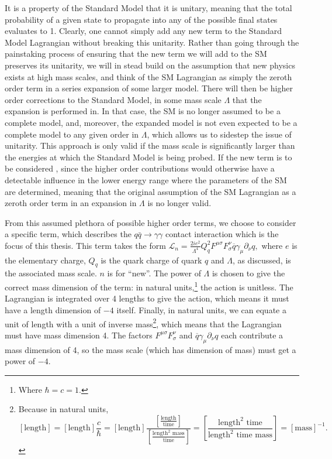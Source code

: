 It is a property of the Standard Model
that it is unitary, meaning that the total probability of a given state to propagate into any of the possible final states evaluates to 1. Clearly, one cannot simply add any new term to the Standard Model Lagrangian without breaking this unitarity. Rather than going through the painstaking process of ensuring that the new term we will add to the SM preserves its unitarity, we will in stead build on the assumption that new physics exists at high mass scales, and think of the SM Lagrangian as simply the zeroth order term in a series expansion of some larger model. There will then be higher order corrections to the Standard Model, in some mass scale $\Lambda$ that the expansion is performed in. 
In that case, the SM is no longer assumed to be a complete model, and, moreover, the expanded model is not even expected to be a complete model to any given order in $\Lambda$, which allows us to sidestep the issue of unitarity.
This approach is only valid if the mass scale is significantly larger than the energies at which the Standard Model is being probed. If the new term is to be considered , since the higher order contributions would otherwise have a detectable influence in the lower energy range where the parameters of the SM are determined, meaning that the original assumption of the SM Lagrangian as a zeroth order term in an expansion in $\Lambda$ is no longer valid.

From this assumed plethora of possible higher order terms, we choose to consider a specific term, which describes the $q\bar q\rightarrow\gamma\gamma$ contact interaction which is the focus of this thesis. This term takes the form \cite{rizzo}
\(\mathcal L_n = \frac{2ie^2}{\Lambda^4}Q_q^2F^{\mu\sigma}F^\nu_\sigma\overline{q}\gamma_\mu\partial_\nu q,\label{rizzo}\)
where $e$ is the elementary charge, $Q_q$ is the quark charge of quark $q$ and $\Lambda$, as discussed, is the associated mass scale. $n$ is for ``new''. The power of $\Lambda$ is chosen to give the correct mass dimension of the term: in natural units,\footnote{Where $\hbar = c = 1$.} the action is unitless. The Lagrangian is integrated over 4 lengths to give the action, which means it must have a length dimension of $-4$ itself. Finally, in natural units, we can equate a unit of length with a unit of inverse mass\footnote{Because in natural units, \[[\text{length}]=[\text{length}]\frac{c}{\hbar}=[\text{length}]\frac{\left[\frac{\text{length}}{\text{time}}\right]}{\left[\frac{\text{length}^2\text{ mass}}{\text{time}}\right]}=\left[\frac{\text{length}^2\text{ time}}{\text{length}^2\text{ time}\text{ mass}}\right]=[\text{mass}]^{-1}. \]}, which means that the Lagrangian must have mass dimension 4. The factors $F^{\mu\sigma}F^\nu_\sigma$ and $\overline{q}\gamma_\mu\partial_\nu q$ each contribute a mass dimension of 4, so the mass scale (which has dimension of mass) must get a power of $-4$.

